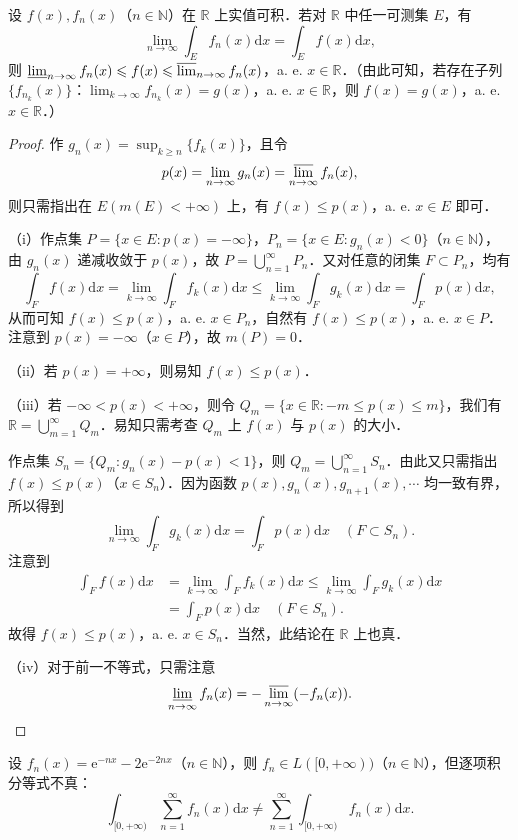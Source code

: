 \documentclass[../../main.tex]{subfiles}
\begin{document}
\begin{example}
设 \( f(x), f_n(x) \)（\( n \in \mathbb{N} \)）在 \( \mathbb{R} \) 上实值可积．若对 \( \mathbb{R} \) 中任一可测集 \( E \)，有
\[
\lim_{n \to \infty} \int_E f_n(x) \mathrm{d}x = \int_E f(x) \mathrm{d}x,
\]
则 \( \varliminf_{n \to \infty} f_n(x) \leqslant f(x) \leqslant \varlimsup_{n \to \infty} f_n(x) \)，a. e. \( x \in \mathbb{R} \)．（由此可知，若存在子列 \( \{ f_{n_k}(x) \} \)：\( \lim_{k \to \infty} f_{n_k}(x) = g(x) \)，a. e. \( x \in \mathbb{R} \)，则 \( f(x) = g(x) \)，a. e. \( x \in \mathbb{R} \)．）
\end{example}
\begin{proof}
作 \( g_n(x) = \sup_{k \geqslant n} \{ f_k(x) \} \)，且令
\[
p(x) = \lim_{n \to \infty} g_n(x) = \varlimsup_{n \to \infty} f_n(x),
\]
则只需指出在 \( E(m(E) < +\infty) \) 上，有 \( f(x) \leqslant p(x) \)，a. e. \( x \in E \) 即可．

（i）作点集 \( P = \{ x \in E : p(x) = -\infty \} \)，\( P_n = \{ x \in E : g_n(x) < 0 \} \)（\( n \in \mathbb{N} \)），由 \( g_n(x) \) 递减收敛于 \( p(x) \)，故 \( P = \bigcup_{n=1}^{\infty} P_n \)．又对任意的闭集 \( F \subset P_n \)，均有
\[
\int_F f(x) \mathrm{d}x = \lim_{k \to \infty} \int_F f_k(x) \mathrm{d}x \leqslant \lim_{k \to \infty} \int_F g_k(x) \mathrm{d}x = \int_F p(x) \mathrm{d}x,
\]
从而可知 \( f(x) \leqslant p(x) \)，a. e. \( x \in P_n \)，自然有 \( f(x) \leqslant p(x) \)，a. e. \( x \in P \)．注意到 \( p(x) = -\infty \)（\( x \in P \)），故 \( m(P) = 0 \)．

（ii）若 \( p(x) = +\infty \)，则易知 \( f(x) \leqslant p(x) \)．

（iii）若 \( -\infty < p(x) < +\infty \)，则令 \( Q_m = \{ x \in \mathbb{R} : -m \leqslant p(x) \leqslant m \} \)，我们有 \( \mathbb{R} = \bigcup_{m=1}^{\infty} Q_m \)．易知只需考查 \( Q_m \) 上 \( f(x) \) 与 \( p(x) \) 的大小．

作点集 \( S_n = \{ Q_m : g_n(x) - p(x) < 1 \} \)，则 \( Q_m = \bigcup_{n=1}^{\infty} S_n \)．由此又只需指出 \( f(x) \leqslant p(x) \)（\( x \in S_n \)）．因为函数 \( p(x), g_n(x), g_{n+1}(x), \cdots \) 均一致有界，所以得到
\[
\lim_{n \to \infty} \int_F g_k(x) \mathrm{d}x = \int_F p(x) \mathrm{d}x \quad (F \subset S_n).
\]
注意到
\begin{align*}
\int_F f(x) \mathrm{d}x &= \lim_{k \to \infty} \int_F f_k(x) \mathrm{d}x \leqslant \lim_{k \to \infty} \int_F g_k(x) \mathrm{d}x \\
&= \int_F p(x) \mathrm{d}x \quad (F \in S_n).
\end{align*}
故得 \( f(x) \leqslant p(x) \)，a. e. \( x \in S_n \)．当然，此结论在 \( \mathbb{R} \) 上也真．

（iv）对于前一不等式，只需注意
\[
\varliminf_{n \to \infty} f_n(x) = -\varlimsup_{n \to \infty} (-f_n(x)).
\]
\end{proof}
\begin{remark}
设 \( f_n(x) = \mathrm{e}^{-nx} - 2\mathrm{e}^{-2nx} \)（\( n \in \mathbb{N} \)），则 \( f_n \in L([0, +\infty)) \)（\( n \in \mathbb{N} \)），但逐项积分等式不真：
\[
\int_{[0, +\infty)} \sum_{n=1}^{\infty} f_n(x) \mathrm{d}x \neq \sum_{n=1}^{\infty} \int_{[0, +\infty)} f_n(x) \mathrm{d}x.
\]
\end{remark}
\end{document}
